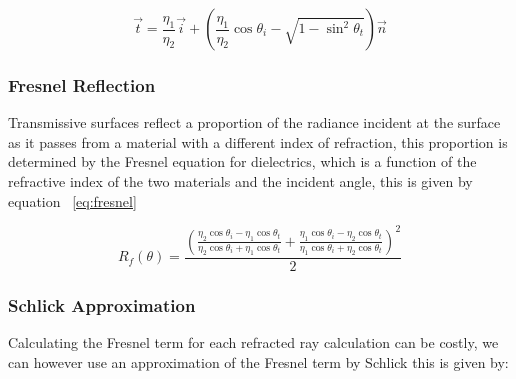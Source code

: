 \begin{equation}
\vec{t} = \frac{\eta_1}{\eta_2} \vec{i} + \left(\frac{\eta_1}{\eta_2} \cos{\theta_i} - \sqrt{1 - \sin^2\theta_t}\right) \vec{n}
\label{eq:refr}
\end{equation}

\begin{figure}
\centering
{}
\end{figure}

\subsubsection{Fresnel Reflection}
Transmissive surfaces reflect a proportion of the radiance incident at the surface as it passes from a material with a different
index of refraction, this proportion is determined by the Fresnel equation for dielectrics, which is a function of the refractive
index of the two materials and the incident angle, this is given by equation ~\ref{eq:fresnel}

\begin{equation}
R_f(\theta)
=
\frac{
	\left(
	\frac
	{
	\eta_2 \cos{\theta_i} - \eta_1 \cos{\theta_t}
	}
	{
	\eta_2 \cos{\theta_i} + \eta_1 \cos{\theta_t}
	}
	+
	\frac
	{
	\eta_1 \cos{\theta_i} - \eta_2 \cos{\theta_t}
	}
	{
	\eta_1 \cos{\theta_i} + \eta_2 \cos{\theta_t}
	}
\right)^2
}{2}
\label{eq:fresnel}
\end{equation}

\subsubsection{Schlick Approximation}
Calculating the Fresnel term for each refracted ray calculation can be costly, we can however use an approximation of the Fresnel term
by Schlick \cite{sc94} this is given by:

